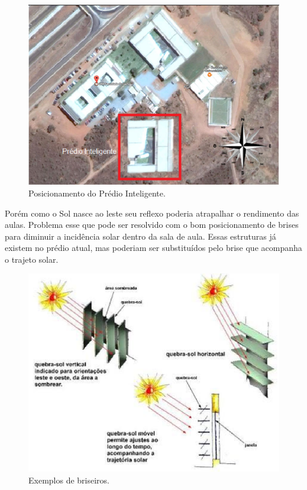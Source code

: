 \begin{figure}[!h]
  \centering
  \includegraphics[keepaspectratio=true,scale=0.45]{figuras/posicao.eps}
  \caption{Posicionamento do Prédio Inteligente.}
  \label{fig:posicao}
\end{figure}

Porém como o Sol nasce ao leste seu reflexo poderia atrapalhar o rendimento das aulas. Problema esse que pode ser resolvido com o bom posicionamento de brises para diminuir a incidência solar dentro da sala de aula. Essas estruturas já existem no prédio atual, mas poderiam ser substituídos pelo brise que acompanha o trajeto solar.

\begin{figure}[!h]
  \centering
  \includegraphics[keepaspectratio=true,scale=0.5]{figuras/briseiros.eps}
  \caption{Exemplos de briseiros.}
  \label{fig:briseiros}
\end{figure}

